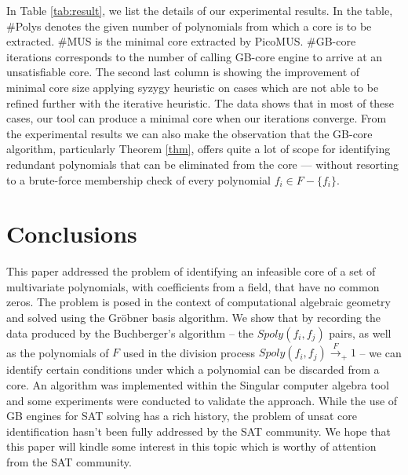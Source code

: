 In Table \ref{tab:result}, we list the details of our experimental
results. In the table, \#Polys denotes the given number of polynomials
from which a core is to be extracted. \#MUS is the minimal core
extracted by PicoMUS. \#GB-core iterations corresponds to the
number of calling GB-core engine to arrive at an unsatisfiable core. The
second last column is showing the improvement of minimal core
size applying syzygy heuristic on cases which are not able to be
refined further with the iterative heuristic.
The data shows that in most of these
cases, our tool can produce a minimal core when our iterations
converge. From the experimental results we can also make the
observation that the GB-core algorithm, particularly Theorem
\ref{thm}, offers quite a lot of scope for identifying redundant
polynomials that can be eliminated from the core --- without resorting
to a brute-force membership check of every polynomial $f_i \in F -
\{f_i\}$. 




\section{Conclusions}
This paper addressed the problem of identifying an infeasible core of
a set of multivariate polynomials, with coefficients from a field,
that have no common zeros. The problem is posed in the context of
computational algebraic geometry and solved using the Gr\"obner basis
algorithm. We show that by recording the data produced by the
Buchberger's algorithm -- the $Spoly(f_i,f_j)$ pairs, as well as the
polynomials of $F$ used in the division process
$Spoly(f_i,f_j)\xrightarrow{F}_+ 1$ -- we can identify certain
conditions under which a polynomial can be discarded from a core. An
algorithm was implemented within the Singular computer algebra tool
and some experiments were conducted to validate the approach. While
the use of GB engines for SAT solving has a rich history, the problem
of unsat core identification hasn't been fully addressed by the SAT
community. We hope that this paper will kindle some interest in this
topic which is worthy of attention from the SAT community. 
